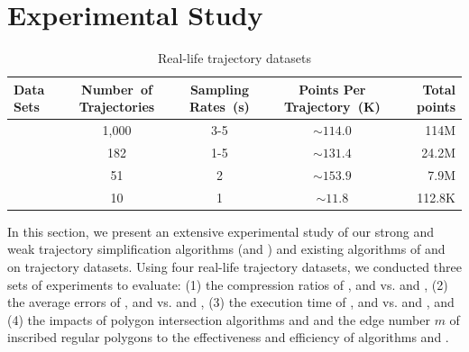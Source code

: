 \section{Experimental Study} %
\label{sec-exp}

\begin{table}[bt!]
	\caption{\small Real-life trajectory datasets}
	\centering
	\small
	\begin{tabular}{|l|c|c|c|r|}
		\hline
		\bf{ Data Sets}& \bf{Number\ of Trajectories}     &\bf {Sampling Rates\ (s)}   &\bf{Points Per Trajectory\ (K)}    &\bf {Total points} \\
		\hline
		\sercar	&1,000	    &3-5	    &$\sim114.0$   &114M\\
		\hline
		\geolife &182	    &1-5	    &$\sim131.4$   &24.2M\\
		\hline
		\mopsi	&51	    	&2	    &$\sim153.9$     &7.9M\\
		\hline
		\pricar	& 10	    &1	        &$\sim11.8$      &112.8K \\
		\hline
	\end{tabular}
	\label{tab:datasets}
	\vspace{-2ex}
\end{table}


In this section, we present an extensive experimental study of our strong and weak trajectory simplification algorithms (\cist and \cista) and existing algorithms of \dps and \squishe on trajectory datasets.
Using four real-life trajectory datasets, we conducted three sets of experiments to evaluate:
(1) the compression ratios of \cisto, \cist and \cista vs. \dps and \squishe,
(2) the average errors of \cisto, \cist and \cista vs. \dps and \squishe,
(3) the execution time of \cisto, \cist and \cista vs. \dps and \squishe, and
(4) the impacts of polygon intersection algorithms \rpia and \cpia and the edge number $m$ of inscribed regular polygons to the effectiveness and efficiency of algorithms \cist and \cista.


